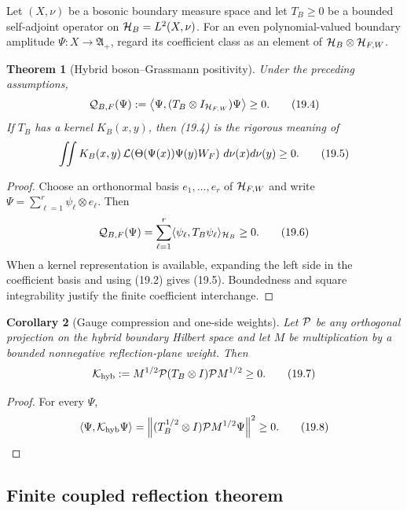\documentclass[11pt]{article}
\newtheorem{theorem}{Theorem}[section]
\newtheorem{corollary}[theorem]{Corollary}
\theoremstyle{remark}
\begin{document}
Let \((X,\nu)\) be a bosonic boundary measure space and let \(T_B\geq0\)
be a bounded self-adjoint operator on \({\cal H}_B=L^2(X,\nu)\).
For an even polynomial-valued boundary amplitude
\(\Psi:X\to{\mathfrak A}_+\), regard its coefficient class as an element
of \({\cal H}_B\otimes{\cal H}_{F,W}\).

\begin{theorem}[Hybrid boson--Grassmann positivity]
\label{thm:v19v16-hybrid}
Under the preceding assumptions,
\[
 {\cal Q}_{B,F}(\Psi)
 :=\left\langle\Psi,
 (T_B\otimes I_{{\cal H}_{F,W}})\Psi\right\rangle
 \geq0.                                                        \tag{19.4}
\]
If \(T_B\) has a kernel \(K_B(x,y)\), then (19.4) is the rigorous meaning
of
\[
 \iint K_B(x,y)\,
 {\cal L}\!\left(\Theta(\Psi(x))\Psi(y)W_F\right)
 \,d\nu(x)d\nu(y)\geq0.                                       \tag{19.5}
\]
\end{theorem}

\begin{proof}
Choose an orthonormal basis \(e_1,\ldots,e_r\) of
\({\cal H}_{F,W}\) and write
\(\Psi=\sum_{\ell=1}^r\psi_\ell\otimes e_\ell\).  Then
\[
 {\cal Q}_{B,F}(\Psi)
 =\sum_{\ell=1}^r\langle\psi_\ell,T_B\psi_\ell\rangle_{{\cal H}_B}
 \geq0.                                                        \tag{19.6}
\]
When a kernel representation is available, expanding the left side in
the coefficient basis and using (19.2) gives (19.5).  Boundedness and
square integrability justify the finite coefficient interchange.
\end{proof}

\begin{corollary}[Gauge compression and one-side weights]
\label{cor:v19v16-compression}
Let \({\cal P}\) be any orthogonal projection on the hybrid boundary
Hilbert space and let \(M\) be multiplication by a bounded nonnegative
reflection-plane weight.  Then
\[
 {\cal K}_{\rm hyb}
 :=M^{1/2}{\cal P}(T_B\otimes I){\cal P}M^{1/2}\geq0.           \tag{19.7}
\]
\end{corollary}

\begin{proof}
For every \(\Psi\),
\[
 \langle\Psi,{\cal K}_{\rm hyb}\Psi\rangle
 =\left\|(T_B^{1/2}\otimes I)
 {\cal P}M^{1/2}\Psi\right\|^2\geq0.                           \tag{19.8}
\]
\end{proof}

\subsection{Finite coupled reflection theorem}
\end{document}
